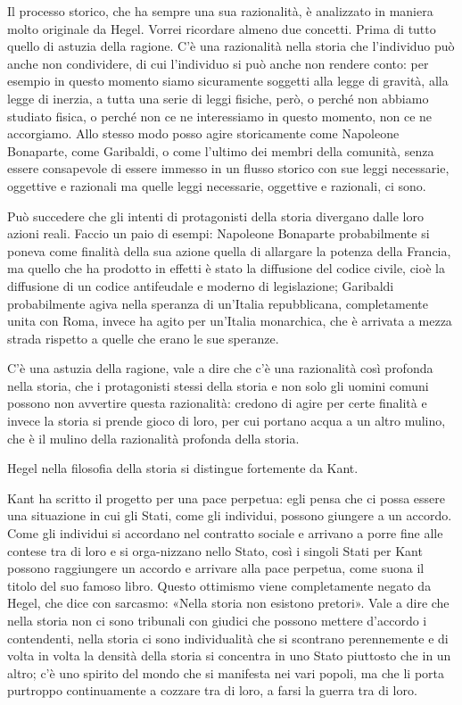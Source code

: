 \documentclass[a4paper,12pt,oneside,openany]{book}%
\begin{document}
Il processo storico, che ha sempre una sua razionalità, è analizzato in maniera molto originale da Hegel. Vorrei ricordare almeno due concetti. Prima di tutto quello di astuzia della ragione. C’è una razionalità nella storia che l’individuo può anche non condividere, di cui l’individuo si può anche non rendere conto: per esempio in questo momento siamo sicuramente soggetti alla legge di gravità, alla legge di inerzia, a tutta una serie di leggi fisiche, però, o perché non abbiamo studiato fisica, o perché non ce ne interessiamo in questo momento, non ce ne accorgiamo. Allo stesso modo posso agire storicamente come Napoleone Bonaparte, come Garibaldi, o come l’ultimo dei membri della comunità, senza essere consapevole di essere immesso in un flusso storico con sue leggi necessarie, oggettive e razionali ma quelle leggi necessarie, oggettive e razionali, ci sono.

Può succedere che gli intenti di protagonisti della storia divergano dalle loro azioni reali. Faccio un paio di esempi: Napoleone Bonaparte probabilmente si poneva come finalità della sua azione quella di allargare la potenza della Francia, ma quello che ha prodotto in effetti è stato la diffusione del codice civile, cioè la diffusione di un codice antifeudale e moderno di legislazione; Garibaldi probabilmente agiva nella speranza di un’Italia repubblicana, completamente unita con Roma, invece ha agito per un’Italia monarchica, che è arrivata a mezza strada rispetto a quelle che erano le sue speranze.

C’è una astuzia della ragione, vale a dire che c’è una razionalità così profonda nella storia, che i protagonisti stessi della storia e non solo gli uomini comuni possono non avvertire questa razionalità: credono di agire per certe finalità e invece la storia si prende gioco di loro, per cui portano acqua a un altro mulino, che è il mulino della razionalità profonda della storia.

Hegel nella filosofia della storia si distingue fortemente da Kant.

Kant ha scritto il progetto per una pace perpetua: egli pensa che ci possa essere una situazione in cui gli Stati, come gli individui, possono giungere a un accordo. Come gli individui si accordano nel contratto sociale e arrivano a porre fine alle contese tra di loro e si orga-nizzano nello Stato, così i singoli Stati per Kant possono raggiungere un accordo e arrivare alla pace perpetua, come suona il titolo del suo famoso libro. Questo ottimismo viene completamente negato da Hegel, che dice con sarcasmo: «Nella storia non esistono pretori». Vale a dire che nella storia non ci sono tribunali con giudici che possono mettere d’accordo i contendenti, nella storia ci sono individualità che si scontrano perennemente e di volta in volta la densità della storia si concentra in uno Stato piuttosto che in un altro; c’è uno spirito del mondo che si manifesta nei vari popoli, ma che li porta purtroppo continuamente a cozzare tra di loro, a farsi la guerra tra di loro.
\end{document}
